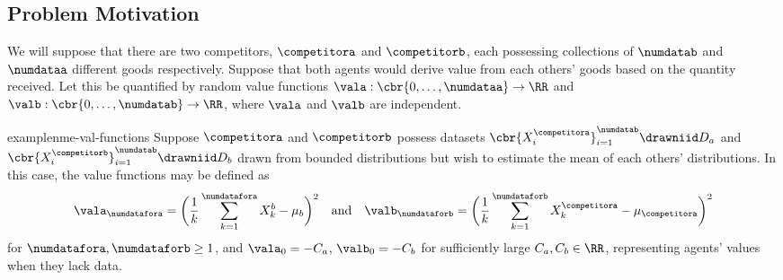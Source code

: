     

\subsection{Problem Motivation}

We will suppose that there are two competitors, $\competitora$ and $\competitorb$, each possessing 
collections of $\numdatab$ and $\numdataa$ 
different goods
respectively. Suppose that both agents would derive value from each others' goods based on the quantity
received.
Let this be quantified by random value functions
$\vala:\cbr{0,\ldots,\numdataa}\rightarrow\RR$ and 
$\valb:\cbr{0,\ldots,\numdatab}\rightarrow\RR$, where $\vala$ and $\valb$ are independent.


\begin{restatable}{example}{nme-val-functions}
    \label{ex:nme-val-functions}
    Suppose $\competitora$ and $\competitorb$ possess datasets
    \(
        \cbr{X^\competitora_i}_{i=1}^\numdatab
        \drawniid
        D_a
    \)
    and
    \(
        \cbr{X^\competitorb_i}_{i=1}^\numdatab
        \drawniid
        D_b
    \)
    drawn from bounded distributions
    but wish to estimate the mean of each others' distributions. In this case, the value 
    functions may be defined as
    \begin{align*}
        \vala_{\numdatafora}
        =
        \bigg(
            \frac{1}{k}
            \sum_{k=1}^\numdatafora
            X^b_k
            -
            \mu_b
        \bigg)^2
        \quad
        \text{and}
        \quad
        \valb_{\numdataforb}
        =
        \bigg(
            \frac{1}{k}
            \sum_{k=1}^\numdataforb
            X^\competitora_k
            -
            \mu_\competitora
        \bigg)^2
    \end{align*}
    for $\numdatafora,\numdataforb\geq 1$, and $\vala_0=-C_a$, $\valb_0=-C_b$ 
    for sufficiently large $C_a,C_b\in\RR$,
    representing agents' values when they lack data.
\end{restatable}

